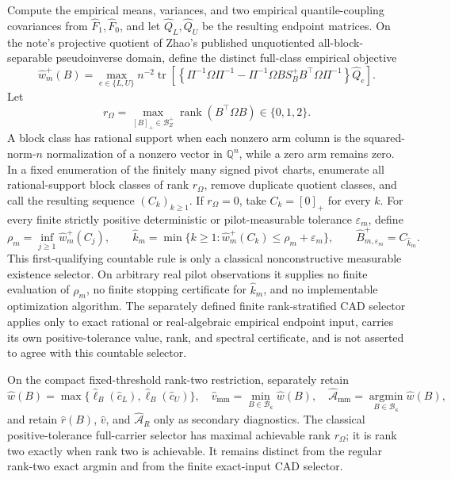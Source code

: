 Compute the empirical means, variances, and two empirical quantile-coupling covariances from \(\widehat F_1,\widehat F_0\), and let \(\widehat Q_L,\widehat Q_U\) be the resulting endpoint matrices.  On the note's projective quotient of Zhao's published unquotiented all-block-separable pseudoinverse domain, define the distinct full-class empirical objective
\[
\widehat w_m^+(B)=
\max_{e\in\{L,U\}}n^{-2}\operatorname{tr}\!\left[
\left\{\Pi^{-1}\Omega\Pi^{-1}
-\Pi^{-1}\Omega B S_B^+B^{\top}\Omega\Pi^{-1}\right\}\widehat Q_e
\right].
\]
Let
\[
r_\Omega=\max_{[B]_+\in\mathcal B_Z^+}\operatorname{rank}(B^{\top}\Omega B)\in\{0,1,2\}.
\]
A block class has rational support when each nonzero arm column is the squared-norm-\(n\) normalization of a nonzero vector in \(\mathbb Q^n\), while a zero arm remains zero.  In a fixed enumeration of the finitely many signed pivot charts, enumerate all rational-support block classes of rank \(r_\Omega\), remove duplicate quotient classes, and call the resulting sequence \((C_k)_{k\ge1}\).  If \(r_\Omega=0\), take \(C_k=[0]_+\) for every \(k\).  For every finite strictly positive deterministic or pilot-measurable tolerance \(\varepsilon_m\), define
\[
 \rho_m=\inf_{j\ge1}\widehat w_m^+(C_j),
 \qquad
 \widehat k_m=
 \min\{k\ge1:\widehat w_m^+(C_k)\le\rho_m+\varepsilon_m\},
 \qquad
 \widehat B_{m,\varepsilon_m}^+=C_{\widehat k_m}.
\]
This first-qualifying countable rule is only a classical nonconstructive measurable existence selector.  On arbitrary real pilot observations it supplies no finite evaluation of \(\rho_m\), no finite stopping certificate for \(\widehat k_m\), and no implementable optimization algorithm.  The separately defined finite rank-stratified CAD selector applies only to exact rational or real-algebraic empirical endpoint input, carries its own positive-tolerance value, rank, and spectral certificate, and is not asserted to agree with this countable selector.

On the compact fixed-threshold rank-two restriction, separately retain
\[
\widehat w(B)=\max\{\widehat\ell_B(\widehat c_L),\widehat\ell_B(\widehat c_U)\},
\quad
\widehat v_{\mathrm{mm}}=\min_{B\in\mathcal B_\kappa}\widehat w(B),
\quad
\widehat{\mathcal A}_{\mathrm{mm}}=\operatorname*{argmin}_{B\in\mathcal B_\kappa}\widehat w(B),
\]
and retain \(\widehat r(B)\), \(\widehat v\), and \(\widehat{\mathcal A}_R\) only as secondary diagnostics.  The classical positive-tolerance full-carrier selector has maximal achievable rank \(r_\Omega\); it is rank two exactly when rank two is achievable.  It remains distinct from the regular rank-two exact argmin and from the finite exact-input CAD selector.